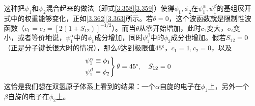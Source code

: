 这种把$\psi_1$和$\psi_2$混合起来的做法（即式\eqref{3.358}\eqref{3.359}）使得$\phi_1,\phi_2$在$\psi_1^\alpha,\psi_1^\beta$的基组展开式中的权重能够变化，正如\eqref{3.362}\eqref{3.363}所示。若$\theta=0$，这个波函数就是限制性波函数（$c_1=c_2=[2(1+S_{12} )]^{-1/2}$）。而当$\theta$从零开始增加，此时$c_1$变大，$c_2$变小，或者等价地说，$\psi_1^\alpha$中的$\phi_1$成分增加，同时$\psi_1^\beta$中的$\phi_2$成分也增加。假若$S_{12}=0$（正是分子键长很大时的情况），那么$\theta$达到极限值$45\text{°}$，$c_1=1,c_2=0$，以及
\begin{align}
\begin{rcases*}
\psi_1^\alpha \equiv \phi_1\\
\psi_1^\beta \equiv \phi_2
\end{rcases*}\theta = 45\text{°},\quad S_{12}=0
\end{align}
这恰是我们想在双氢原子体系上看到的结果：一个$\alpha$自旋的电子在$\phi_1$上，另外一个$\beta$自旋的电子在$\phi_2$上。








\theendnotes


